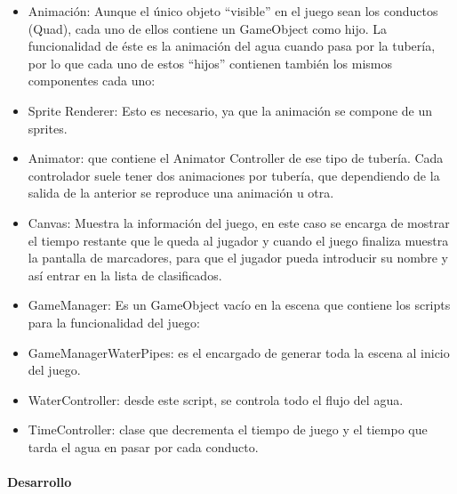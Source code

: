 \documentclass[]{article}
\begin{document}
\begin{itemize}
\itemsep1pt\parskip0pt
\item
  Animación: Aunque el único objeto ``visible'' en el juego sean los
  conductos (Quad), cada uno de ellos contiene un GameObject como hijo.
  La funcionalidad de éste es la animación del agua cuando pasa por la
  tubería, por lo que cada uno de estos ``hijos'' contienen también los
  mismos componentes cada uno:
\end{itemize}

\begin{itemize}
\itemsep1pt\parskip0pt
\item
  Sprite Renderer: Esto es necesario, ya que la animación se compone de
  un sprites.
\item
  Animator: que contiene el Animator Controller de ese tipo de tubería.
  Cada controlador suele tener dos animaciones por tubería, que
  dependiendo de la salida de la anterior se reproduce una animación u
  otra.
\end{itemize}

\begin{itemize}
\itemsep1pt\parskip0pt
\item
  Canvas: Muestra la información del juego, en este caso se encarga de
  mostrar el tiempo restante que le queda al jugador y cuando el juego
  finaliza muestra la pantalla de marcadores, para que el jugador pueda
  introducir su nombre y así entrar en la lista de clasificados.
\item
  GameManager: Es un GameObject vacío en la escena que contiene los
  scripts para la funcionalidad del juego:
\end{itemize}

\begin{itemize}
\itemsep1pt\parskip0pt
\item
  GameManagerWaterPipes: es el encargado de generar toda la escena al
  inicio del juego.
\item
  WaterController: desde este script, se controla todo el flujo del
  agua.
\item
  TimeController: clase que decrementa el tiempo de juego y el tiempo
  que tarda el agua en pasar por cada conducto.
\end{itemize}

\paragraph{Desarrollo}\label{h.2u6wntf}
\end{document}
